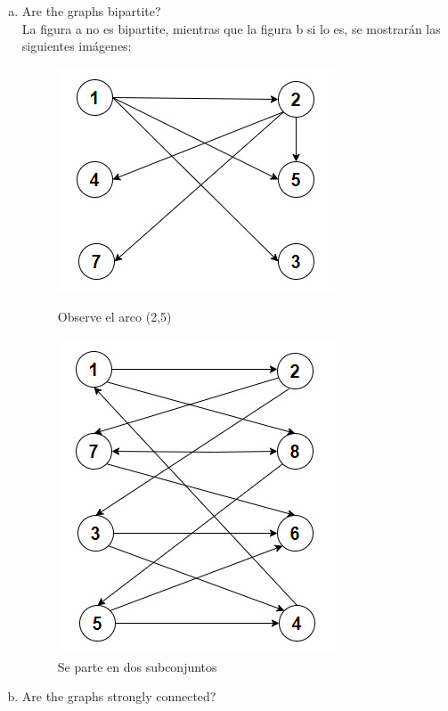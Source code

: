 \documentclass{report}
\begin{document}
\begin{enumerate}[2.1]
\begin{enumerate}[(a)]
        \item Are the graphs bipartite?
        \\ La figura a no es bipartite, mientras que la figura b si lo es, se mostrarán las siguientes imágenes:
        \begin{figure}[h]
            \begin{minipage}[b]{0.4\linewidth}
            \centering
            \includegraphics[scale = 0.5]{2.3incisobfiguraa.jpeg}
            \caption{Observe el arco (2,5)}
            \end{minipage}
            \hspace{0.5cm}
            \begin{minipage}[b]{0.4\linewidth}
            \centering
            \includegraphics[scale = 0.5]{2.3incisobfigurab.jpeg}
            \caption{Se parte en dos subconjuntos}
            \end{minipage}
        \end{figure}
        \item Are the graphs strongly connected?

\end{enumerate}
\end{enumerate}
\end{document}
